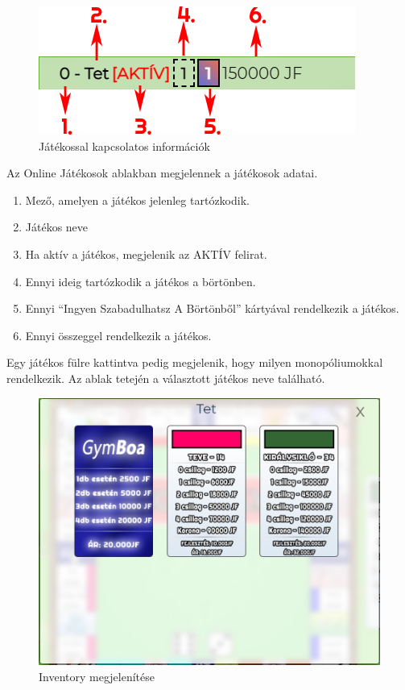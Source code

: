 
\begin{figure}[h!]
\centering
\includegraphics[scale=0.6]{images/Nevtelen-7.png}
\caption{Játékossal kapcsolatos információk}
\label{fig:ff}
\end{figure}

Az Online Játékosok ablakban megjelennek a játékosok adatai.
\begin{enumerate}
	\item Mező, amelyen a játékos jelenleg tartózkodik.
	\item Játékos neve
	\item Ha aktív a játékos, megjelenik az AKTÍV felirat.
	\item Ennyi ideig tartózkodik a játékos a börtönben.
	\item Ennyi “Ingyen Szabadulhatsz A Börtönből” kártyával rendelkezik a játékos.
	\item Ennyi összeggel rendelkezik a játékos.
\end{enumerate}
\newpage
Egy játékos fülre kattintva pedig megjelenik, hogy milyen monopóliumokkal rendelkezik. Az ablak tetején a választott játékos neve található.

\begin{figure}[h!]
\centering
\includegraphics[scale=0.4]{images/ca07dc6cdaa3b06f2ed463e12650af68.png}
\caption{Inventory megjelenítése}
\label{fig:ff}
\end{figure}

